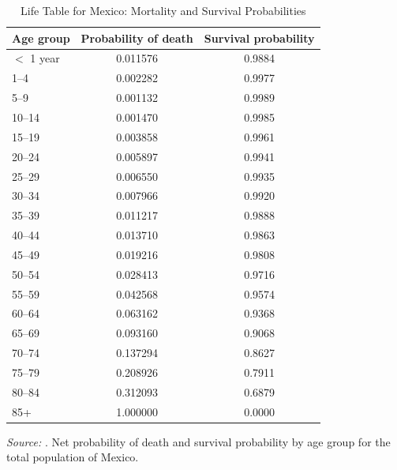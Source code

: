 \documentclass[12pt,a4paper]{article}
\begin{document}
\begin{appendices}
\begin{table}[H]
\centering
\caption{Life Table for Mexico: Mortality and Survival Probabilities}
\label{tab:survival_mx}
\begin{tabular}{lcc}
\hline\hline
\textbf{Age group} & \textbf{Probability of death} & \textbf{Survival probability} \\
\hline
$<$ 1 year   & 0.011576 & 0.9884 \\
1--4         & 0.002282 & 0.9977 \\
5--9         & 0.001132 & 0.9989 \\
10--14       & 0.001470 & 0.9985 \\
15--19       & 0.003858 & 0.9961 \\
20--24       & 0.005897 & 0.9941 \\
25--29       & 0.006550 & 0.9935 \\
30--34       & 0.007966 & 0.9920 \\
35--39       & 0.011217 & 0.9888 \\
40--44       & 0.013710 & 0.9863 \\
45--49       & 0.019216 & 0.9808 \\
50--54       & 0.028413 & 0.9716 \\
55--59       & 0.042568 & 0.9574 \\
60--64       & 0.063162 & 0.9368 \\
65--69       & 0.093160 & 0.9068 \\
70--74       & 0.137294 & 0.8627 \\
75--79       & 0.208926 & 0.7911 \\
80--84       & 0.312093 & 0.6879 \\
85+          & 1.000000 & 0.0000 \\
\hline\hline
\end{tabular}
\begin{minipage}{\linewidth}
\smallskip
\footnotesize
\textit{Source:} \citet{UISP2019}. Net probability of death and
survival probability by age group for the total population of Mexico.
\end{minipage}
\end{table}

\end{appendices}



\end{document}
